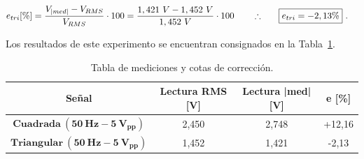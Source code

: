       \begin{align*}
        e_{tri} [\%] = \dfrac{V_{|med|} - V_{RMS}}{V_{RMS}} \cdot 100
               = \dfrac{1,421~V - 1,452~V}{1,452~V} \cdot 100
               \hspace{20pt} \therefore \hspace{20pt} \Aboxed{e_{tri}= -2,13\%}~.
      \end{align*}

    Los resultados de este experimento se encuentran consignados en la
    Tabla~\ref{tab:MedicionesOndasCuadYTrian}.
  
    \begin{table}[H] \centering
      \begin{tabular}{|c|c|c|c|} \hline
        \textbf{Señal}     & \textbf{Lectura RMS [V]}  & \textbf{Lectura |med| [V]} & \textbf{e [\%]} \\ \hline
      $\mathbf{Cuadrada~(50~Hz - 5~V_{pp})}$    & 2,450     & 2,748         &  +12,16        \\ \hline
      $\mathbf{Triangular~(50~Hz - 5~V_{pp})}$  & 1,452      & 1,421        &  -2,13         \\ \hline
      \end{tabular}
      \caption{Tabla de mediciones y cotas de corrección.}
      \label{tab:MedicionesOndasCuadYTrian}
    \end{table}
